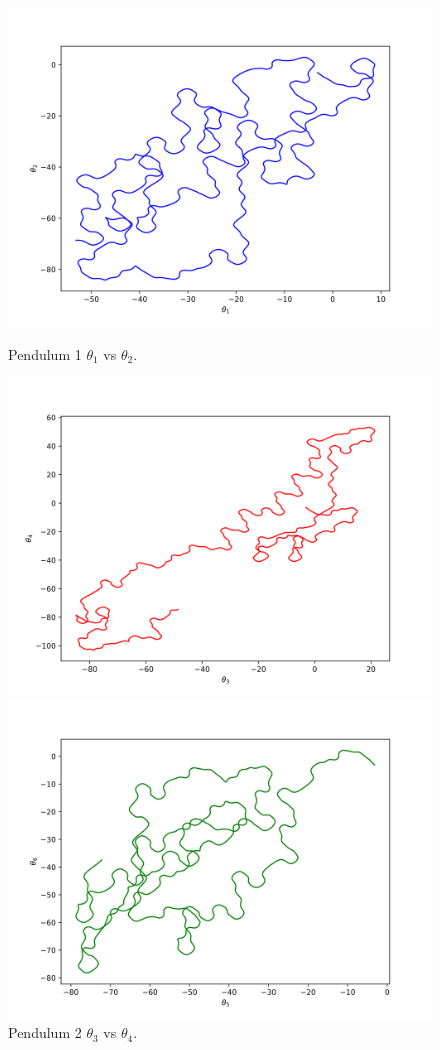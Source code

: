 \documentclass[runningheads]{llncs}
\begin{document}
\begin{figure}[!htb]
  \includegraphics[width=\linewidth]{img/theta_theta_1.png}
  \caption{Pendulum 1 $\theta_1$ vs $\theta_2$.}\label{fig:theta_vs_theta_1}
\endminipage\hfill
{}
  \includegraphics[width=\linewidth]{img/theta_theta_2.png}
  \caption{Pendulum 2 $\theta_3$ vs $\theta_4$.}\label{fig:theta_vs_theta_2}
\endminipage\hfill
{}%
  \includegraphics[width=\linewidth]{img/theta_theta_3.png}

\end{figure}
\end{document}
